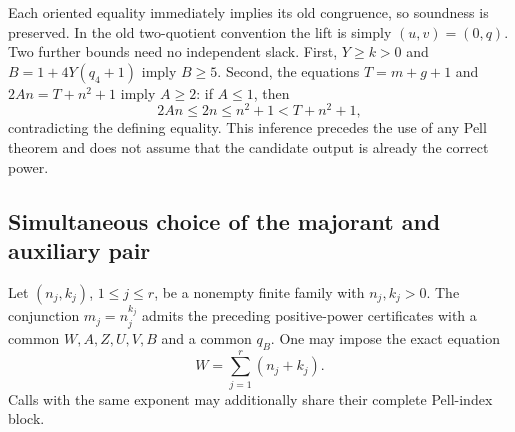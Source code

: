 Each oriented equality immediately implies its old congruence, so
soundness is preserved.  In the old two-quotient convention the lift is
simply $(u,v)=(0,q)$.  Two further bounds need no independent slack.
First, $Y\geq k>0$ and $B=1+4Y(q_4+1)$ imply $B\geq5$.
Second, the equations $T=m+g+1$ and $2An=T+n^2+1$ imply $A\geq2$:
if $A\leq1$, then
\[
 2An\leq2n\leq n^2+1<T+n^2+1,
\]
contradicting the defining equality.  This inference precedes the use
of any Pell theorem and does not assume that the candidate output is
already the correct power.

\subsection{Simultaneous choice of the majorant and auxiliary pair}

\begin{theorem}
\label{thm:sa-shared-pell}
Let $(n_j,k_j)$, $1\leq j\leq r$, be a nonempty finite family with
$n_j,k_j>0$.  The conjunction $m_j=n_j^{k_j}$ admits the preceding
positive-power certificates with a common $W,A,Z,U,V,B$ and a common
$q_B$.  One may impose the exact equation
\[
 W=\sum_{j=1}^r(n_j+k_j).
\]
Calls with the same exponent may additionally share their complete
Pell-index block.
\end{theorem}

